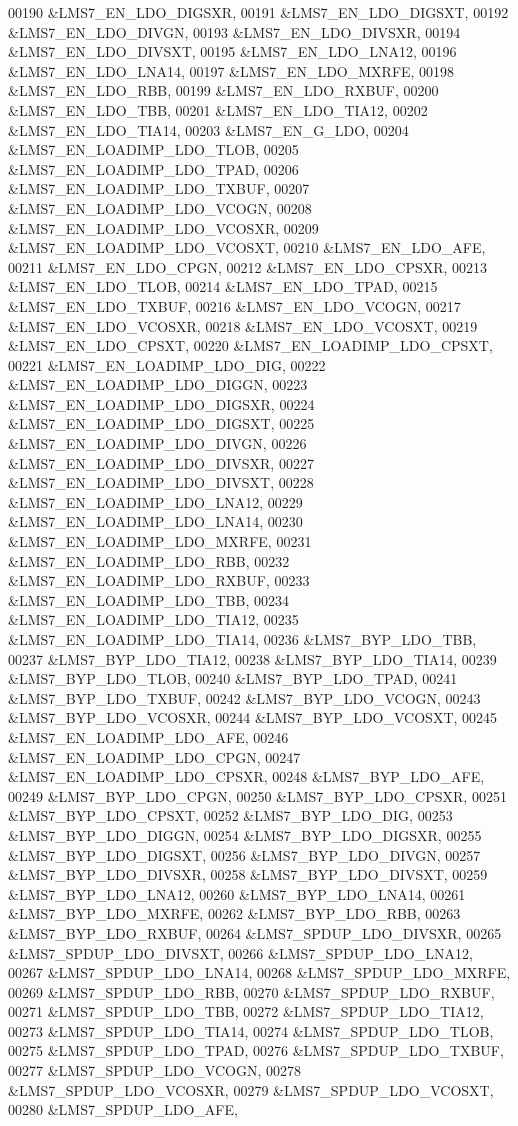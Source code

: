 \begin{DoxyCode}
00190 &LMS7_EN_LDO_DIGSXR,
00191 &LMS7_EN_LDO_DIGSXT,
00192 &LMS7_EN_LDO_DIVGN,
00193 &LMS7_EN_LDO_DIVSXR,
00194 &LMS7_EN_LDO_DIVSXT,
00195 &LMS7_EN_LDO_LNA12,
00196 &LMS7_EN_LDO_LNA14,
00197 &LMS7_EN_LDO_MXRFE,
00198 &LMS7_EN_LDO_RBB,
00199 &LMS7_EN_LDO_RXBUF,
00200 &LMS7_EN_LDO_TBB,
00201 &LMS7_EN_LDO_TIA12,
00202 &LMS7_EN_LDO_TIA14,
00203 &LMS7_EN_G_LDO,
00204 &LMS7_EN_LOADIMP_LDO_TLOB,
00205 &LMS7_EN_LOADIMP_LDO_TPAD,
00206 &LMS7_EN_LOADIMP_LDO_TXBUF,
00207 &LMS7_EN_LOADIMP_LDO_VCOGN,
00208 &LMS7_EN_LOADIMP_LDO_VCOSXR,
00209 &LMS7_EN_LOADIMP_LDO_VCOSXT,
00210 &LMS7_EN_LDO_AFE,
00211 &LMS7_EN_LDO_CPGN,
00212 &LMS7_EN_LDO_CPSXR,
00213 &LMS7_EN_LDO_TLOB,
00214 &LMS7_EN_LDO_TPAD,
00215 &LMS7_EN_LDO_TXBUF,
00216 &LMS7_EN_LDO_VCOGN,
00217 &LMS7_EN_LDO_VCOSXR,
00218 &LMS7_EN_LDO_VCOSXT,
00219 &LMS7_EN_LDO_CPSXT,
00220 &LMS7_EN_LOADIMP_LDO_CPSXT,
00221 &LMS7_EN_LOADIMP_LDO_DIG,
00222 &LMS7_EN_LOADIMP_LDO_DIGGN,
00223 &LMS7_EN_LOADIMP_LDO_DIGSXR,
00224 &LMS7_EN_LOADIMP_LDO_DIGSXT,
00225 &LMS7_EN_LOADIMP_LDO_DIVGN,
00226 &LMS7_EN_LOADIMP_LDO_DIVSXR,
00227 &LMS7_EN_LOADIMP_LDO_DIVSXT,
00228 &LMS7_EN_LOADIMP_LDO_LNA12,
00229 &LMS7_EN_LOADIMP_LDO_LNA14,
00230 &LMS7_EN_LOADIMP_LDO_MXRFE,
00231 &LMS7_EN_LOADIMP_LDO_RBB,
00232 &LMS7_EN_LOADIMP_LDO_RXBUF,
00233 &LMS7_EN_LOADIMP_LDO_TBB,
00234 &LMS7_EN_LOADIMP_LDO_TIA12,
00235 &LMS7_EN_LOADIMP_LDO_TIA14,
00236 &LMS7_BYP_LDO_TBB,
00237 &LMS7_BYP_LDO_TIA12,
00238 &LMS7_BYP_LDO_TIA14,
00239 &LMS7_BYP_LDO_TLOB,
00240 &LMS7_BYP_LDO_TPAD,
00241 &LMS7_BYP_LDO_TXBUF,
00242 &LMS7_BYP_LDO_VCOGN,
00243 &LMS7_BYP_LDO_VCOSXR,
00244 &LMS7_BYP_LDO_VCOSXT,
00245 &LMS7_EN_LOADIMP_LDO_AFE,
00246 &LMS7_EN_LOADIMP_LDO_CPGN,
00247 &LMS7_EN_LOADIMP_LDO_CPSXR,
00248 &LMS7_BYP_LDO_AFE,
00249 &LMS7_BYP_LDO_CPGN,
00250 &LMS7_BYP_LDO_CPSXR,
00251 &LMS7_BYP_LDO_CPSXT,
00252 &LMS7_BYP_LDO_DIG,
00253 &LMS7_BYP_LDO_DIGGN,
00254 &LMS7_BYP_LDO_DIGSXR,
00255 &LMS7_BYP_LDO_DIGSXT,
00256 &LMS7_BYP_LDO_DIVGN,
00257 &LMS7_BYP_LDO_DIVSXR,
00258 &LMS7_BYP_LDO_DIVSXT,
00259 &LMS7_BYP_LDO_LNA12,
00260 &LMS7_BYP_LDO_LNA14,
00261 &LMS7_BYP_LDO_MXRFE,
00262 &LMS7_BYP_LDO_RBB,
00263 &LMS7_BYP_LDO_RXBUF,
00264 &LMS7_SPDUP_LDO_DIVSXR,
00265 &LMS7_SPDUP_LDO_DIVSXT,
00266 &LMS7_SPDUP_LDO_LNA12,
00267 &LMS7_SPDUP_LDO_LNA14,
00268 &LMS7_SPDUP_LDO_MXRFE,
00269 &LMS7_SPDUP_LDO_RBB,
00270 &LMS7_SPDUP_LDO_RXBUF,
00271 &LMS7_SPDUP_LDO_TBB,
00272 &LMS7_SPDUP_LDO_TIA12,
00273 &LMS7_SPDUP_LDO_TIA14,
00274 &LMS7_SPDUP_LDO_TLOB,
00275 &LMS7_SPDUP_LDO_TPAD,
00276 &LMS7_SPDUP_LDO_TXBUF,
00277 &LMS7_SPDUP_LDO_VCOGN,
00278 &LMS7_SPDUP_LDO_VCOSXR,
00279 &LMS7_SPDUP_LDO_VCOSXT,
00280 &LMS7_SPDUP_LDO_AFE,

\end{DoxyCode}
